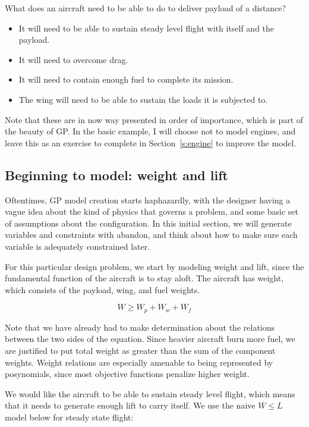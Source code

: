 What does an aircraft need to be able to do to deliver payload of a distance?
\begin{itemize}
	\item It will need to be able to sustain steady
    level flight with itself and the payload.
    \item It will need to overcome drag.
	\item It will need to contain enough fuel to complete its mission.
	\item The wing will need to be able to sustain the loads it is
    subjected to.
\end{itemize}

Note that these are in now way presented in order of importance, which is part of
the beauty of \gls{GP}. In the basic example, I will choose not to model engines,
and leave this as an exercise
to complete in Section~\ref{s:engine} to improve the model.

\subsection{Beginning to model: weight and lift}

Oftentimes, GP model creation starts haphazardly, with the designer having a
vague idea about the kind of physics that governs a problem, and some basic
set of assumptions about the configuration. In this initial section, we will
generate variables and constraints with abandon, and think about how to make
sure each variable is adequately constrained later.

For this particular design problem, we start by modeling
weight and lift, since the fundamental function of the aircraft is to stay aloft.
The aircraft has weight, which consists of the payload, wing, and fuel weights. 

\begin{equation}
    W \geq W_p + W_w + W_f
\end{equation}

Note that we have already had to make determination about the relations between
the two sides of the equation. Since heavier aircraft burn more fuel, we are justified
to put total weight as greater than the sum of the component weights. Weight relations
are especially amenable to being represented by posynomials, since most objective
functions penalize higher weight.

We would like the aircraft to be able to sustain steady level flight, which means 
that it needs to generate enough lift to carry itself. We use the naive $W \leq L$ 
model below for steady state flight:

